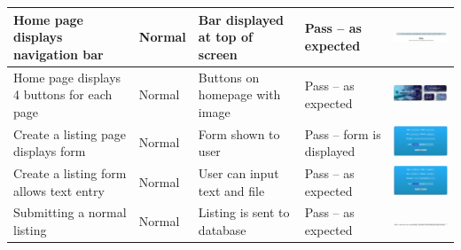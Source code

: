 \begin{center}
\begin{longtable}{|P{17mm}|P{17mm}|P{16mm}|P{17mm}|P{60mm}|}
Home page displays navigation bar & Normal & Bar displayed at top of
screen & Pass -- as expected &
\includegraphics[width=58mm]{ch3_developing/proto3/media/image13.png} \\ \hline
Home page displays 4 buttons for each page & Normal & Buttons on
homepage with image & Pass -- as expected &
\includegraphics[width=58mm]{ch3_developing/proto3/media/image14.png} \\ \hline
Create a listing page displays form & Normal & Form shown to user & Pass
-- form is displayed &
\includegraphics[width=58mm]{ch3_developing/proto3/media/image15.png} \\ \hline
Create a listing form allows text entry & Normal & User can input text
and file & Pass -- as expected &
\includegraphics[width=58mm]{ch3_developing/proto3/media/image16.png} \\ \hline
Submitting a normal listing & Normal & Listing is sent to database &
Pass -- as expected &
\includegraphics[width=58mm]{ch3_developing/proto3/media/image17.png}


\end{longtable}
\end{center}
